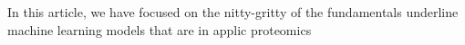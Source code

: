 In this article, we have focused on the nitty-gritty of the fundamentals underline machine learning models that are in applic proteomics